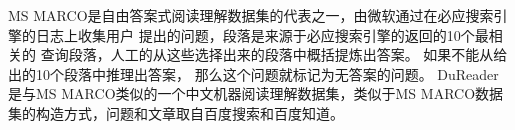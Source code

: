 MS MARCO是自由答案式阅读理解数据集的代表之一，由微软通过在必应搜索引擎的日志上收集用户
提出的问题，段落是来源于必应搜索引擎的返回的10个最相关的
查询段落，人工的从这些选择出来的段落中概括提炼出答案。
如果不能从给出的10个段落中推理出答案，
那么这个问题就标记为无答案的问题。
DuReader是与MS MARCO类似的一个中文机器阅读理解数据集，类似于MS MARCO数据集的构造方式，问题和文章取自百度搜索和百度知道。





